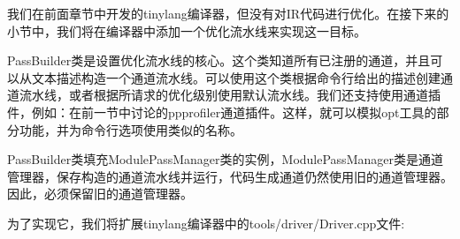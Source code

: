 
我们在前面章节中开发的tinylang编译器，但没有对IR代码进行优化。在接下来的小节中，我们将在编译器中添加一个优化流水线来实现这一目标。


PassBuilder类是设置优化流水线的核心。这个类知道所有已注册的通道，并且可以从文本描述构造一个通道流水线。可以使用这个类根据命令行给出的描述创建通道流水线，或者根据所请求的优化级别使用默认流水线。我们还支持使用通道插件，例如：在前一节中讨论的ppprofiler通道插件。这样，就可以模拟opt工具的部分功能，并为命令行选项使用类似的名称。

PassBuilder类填充ModulePassManager类的实例，ModulePassManager类是通道管理器，保存构造的通道流水线并运行，代码生成通道仍然使用旧的通道管理器。因此，必须保留旧的通道管理器。

为了实现它，我们将扩展tinylang编译器中的tools/driver/Driver.cpp文件:

